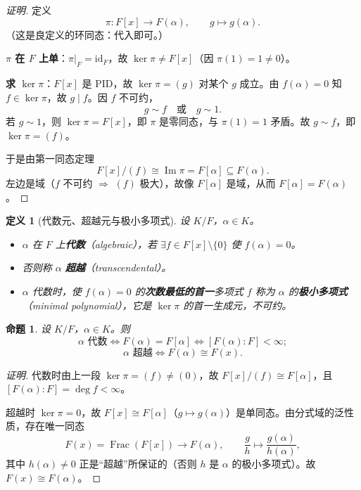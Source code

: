 \documentclass[11pt,a4paper]{ctexart}
\newtheorem*{definition}{定义}
\newtheorem*{proposition}{命题}
\theoremstyle{remark}
\DeclareMathOperator{\Frac}{Frac}
\begin{document}
\begin{proof}[证明]
定义
\[
\pi:F[x]\to F(\alpha),\qquad g\mapsto g(\alpha).
\]
（这是良定义的环同态：代入即可。）

\textbf{$\pi$ 在 $F$ 上单}：$\pi|_F=\mathrm{id}_F$，故 $\ker\pi\neq F[x]$（因 $\pi(1)=1\neq 0$）。

\textbf{求 $\ker\pi$}：$F[x]$ 是 PID，故 $\ker\pi=(g)$ 对某个 $g$ 成立。由 $f(\alpha)=0$ 知 $f\in\ker\pi$，故 $g\mid f$。因 $f$ 不可约，
\[
g\sim f\quad\text{或}\quad g\sim 1 .
\]
若 $g\sim 1$，则 $\ker\pi=F[x]$，即 $\pi$ 是零同态，与 $\pi(1)=1$ 矛盾。故 $g\sim f$，即 $\ker\pi=(f)$。

于是由第一同态定理
\[
F[x]/(f)\cong\operatorname{Im}\pi=F[\alpha]\subseteq F(\alpha).
\]
左边是域（$f$ 不可约 $\Rightarrow$ $(f)$ 极大），故像 $F[\alpha]$ 是域，从而 $F[\alpha]=F(\alpha)$。
\end{proof}

\begin{center}
\end{center}

\begin{definition}[代数元、超越元与极小多项式]
设 $K/F$，$\alpha\in K$。
\begin{itemize}
    \item $\alpha$ 在 $F$ 上\textbf{代数}（algebraic），若 $\exists f\in F[x]\setminus\{0\}$ 使 $f(\alpha)=0$。
    \item 否则称 $\alpha$ \textbf{超越}（transcendental）。
    \item $\alpha$ 代数时，使 $f(\alpha)=0$ 的\textbf{次数最低的首一}多项式 $f$ 称为 $\alpha$ 的\textbf{极小多项式}（minimal polynomial），它是 $\ker\pi$ 的首一生成元，不可约。
\end{itemize}
\end{definition}

\begin{proposition}
设 $K/F$，$\alpha\in K$。则
\[
\alpha \text{ 代数}\iff F(\alpha)=F[\alpha]\iff[F(\alpha):F]<\infty ;
\]
\[
\alpha \text{ 超越}\iff F(\alpha)\cong F(x).
\]
\end{proposition}

\begin{proof}[证明]
代数时由上一段 $\ker\pi=(f)\neq(0)$，故 $F[x]/(f)\cong F[\alpha]$，且 $[F(\alpha):F]=\deg f<\infty$。

超越时 $\ker\pi=0$，故 $F[x]\cong F[\alpha]$（$g\mapsto g(\alpha)$）是单同态。由分式域的泛性质，存在唯一同态
\[
F(x)=\Frac(F[x])\to F(\alpha),\qquad \frac{g}{h}\mapsto \frac{g(\alpha)}{h(\alpha)},
\]
其中 $h(\alpha)\neq 0$ 正是“超越”所保证的（否则 $h$ 是 $\alpha$ 的极小多项式）。故 $F(x)\cong F(\alpha)$。
\end{proof}
\end{document}
